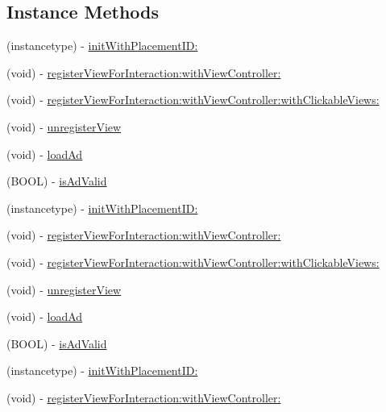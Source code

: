 \subsection*{Instance Methods}
\begin{DoxyCompactItemize}
\item 
(instancetype) -\/ \hyperlink{interfaceFBNativeAd_af90f836b1fae6e994657a1d1d3724922}{init\+With\+Placement\+I\+D\+:}
\item 
(void) -\/ \hyperlink{interfaceFBNativeAd_af14f3514ad32a7b1b73ee6e94c1bba16}{register\+View\+For\+Interaction\+:with\+View\+Controller\+:}
\item 
(void) -\/ \hyperlink{interfaceFBNativeAd_ab3ebbc3b16c0c0be03becf7fcb204946}{register\+View\+For\+Interaction\+:with\+View\+Controller\+:with\+Clickable\+Views\+:}
\item 
(void) -\/ \hyperlink{interfaceFBNativeAd_af146b825ecd435d8e4de489f6b61dcc2}{unregister\+View}
\item 
(void) -\/ \hyperlink{interfaceFBNativeAd_a943433e6b6c4e4a3d3868203642cda15}{load\+Ad}
\item 
(B\+O\+OL) -\/ \hyperlink{interfaceFBNativeAd_ab7ac5c53be873134d4ad5082e542754d}{is\+Ad\+Valid}
\item 
(instancetype) -\/ \hyperlink{interfaceFBNativeAd_af90f836b1fae6e994657a1d1d3724922}{init\+With\+Placement\+I\+D\+:}
\item 
(void) -\/ \hyperlink{interfaceFBNativeAd_af14f3514ad32a7b1b73ee6e94c1bba16}{register\+View\+For\+Interaction\+:with\+View\+Controller\+:}
\item 
(void) -\/ \hyperlink{interfaceFBNativeAd_ab3ebbc3b16c0c0be03becf7fcb204946}{register\+View\+For\+Interaction\+:with\+View\+Controller\+:with\+Clickable\+Views\+:}
\item 
(void) -\/ \hyperlink{interfaceFBNativeAd_af146b825ecd435d8e4de489f6b61dcc2}{unregister\+View}
\item 
(void) -\/ \hyperlink{interfaceFBNativeAd_a943433e6b6c4e4a3d3868203642cda15}{load\+Ad}
\item 
(B\+O\+OL) -\/ \hyperlink{interfaceFBNativeAd_ab7ac5c53be873134d4ad5082e542754d}{is\+Ad\+Valid}
\item 
(instancetype) -\/ \hyperlink{interfaceFBNativeAd_af90f836b1fae6e994657a1d1d3724922}{init\+With\+Placement\+I\+D\+:}
\item 
(void) -\/ \hyperlink{interfaceFBNativeAd_af14f3514ad32a7b1b73ee6e94c1bba16}{register\+View\+For\+Interaction\+:with\+View\+Controller\+:}
\item 

\end{DoxyCompactItemize}
